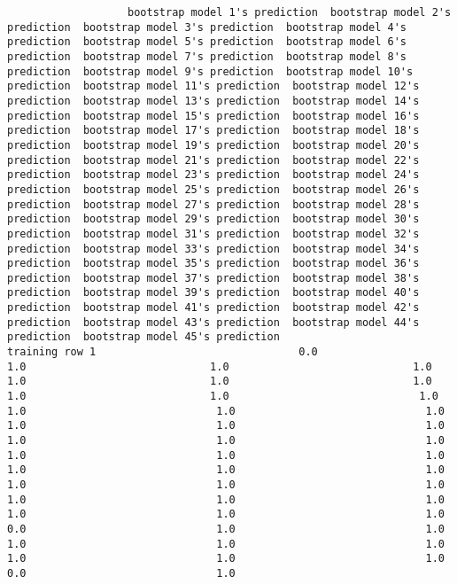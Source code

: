 \documentclass[11pt]{article}
\begin{document}
    
    \begin{verbatim}
                   bootstrap model 1's prediction  bootstrap model 2's prediction  bootstrap model 3's prediction  bootstrap model 4's prediction  bootstrap model 5's prediction  bootstrap model 6's prediction  bootstrap model 7's prediction  bootstrap model 8's prediction  bootstrap model 9's prediction  bootstrap model 10's prediction  bootstrap model 11's prediction  bootstrap model 12's prediction  bootstrap model 13's prediction  bootstrap model 14's prediction  bootstrap model 15's prediction  bootstrap model 16's prediction  bootstrap model 17's prediction  bootstrap model 18's prediction  bootstrap model 19's prediction  bootstrap model 20's prediction  bootstrap model 21's prediction  bootstrap model 22's prediction  bootstrap model 23's prediction  bootstrap model 24's prediction  bootstrap model 25's prediction  bootstrap model 26's prediction  bootstrap model 27's prediction  bootstrap model 28's prediction  bootstrap model 29's prediction  bootstrap model 30's prediction  bootstrap model 31's prediction  bootstrap model 32's prediction  bootstrap model 33's prediction  bootstrap model 34's prediction  bootstrap model 35's prediction  bootstrap model 36's prediction  bootstrap model 37's prediction  bootstrap model 38's prediction  bootstrap model 39's prediction  bootstrap model 40's prediction  bootstrap model 41's prediction  bootstrap model 42's prediction  bootstrap model 43's prediction  bootstrap model 44's prediction  bootstrap model 45's prediction
training row 1                                0.0                             1.0                             1.0                             1.0                             1.0                             1.0                             1.0                             1.0                             1.0                              1.0                              1.0                              1.0                              1.0                              1.0                              1.0                              1.0                              1.0                              1.0                              1.0                              1.0                              1.0                              1.0                              1.0                              1.0                              1.0                              1.0                              1.0                              1.0                              1.0                              1.0                              1.0                              1.0                              1.0                              1.0                              0.0                              1.0                              1.0                              1.0                              1.0                              1.0                              1.0                              1.0                              1.0                              0.0                              1.0

\end{verbatim}
\end{document}
